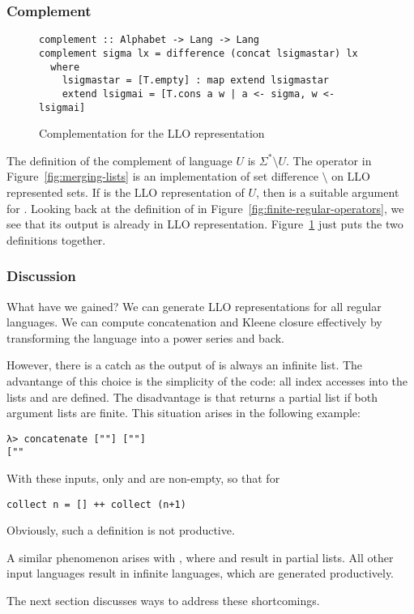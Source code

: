 \subsubsection{Complement}
\begin{figure}[tp]
\begin{lstlisting}
complement :: Alphabet -> Lang -> Lang
complement sigma lx = difference (concat lsigmastar) lx
  where
    lsigmastar = [T.empty] : map extend lsigmastar
    extend lsigmai = [T.cons a w | a <- sigma, w <- lsigmai]
\end{lstlisting}
  \caption{Complementation for the LLO representation}
  \label{fig:llo-complement}
\end{figure}
The definition of the complement of language $U$ is $\Sigma^*\setminus
U$.  The  operator in Figure~\ref{fig:merging-lists}
is an implementation of set difference $\setminus$ on LLO represented
sets.  If  is the LLO 
representation of $U$, then  is a suitable argument for
.  Looking back at the definition of
 in Figure~\ref{fig:finite-regular-operators}, we see
that its output is already in LLO
representation. Figure~\ref{fig:llo-complement} just puts the two
definitions together.

\subsubsection{Discussion}\label{sec:motivation-discussion}
What have we gained? We can generate LLO
representations for all regular languages. We can compute
concatenation and Kleene closure effectively by transforming the
language into a power series and back.

However, there is a catch as the output of  is always
an infinite list. The advantange of this choice is the simplicity of
the code: all index accesses into the lists  and
 are defined. The disadvantage is
that  returns a partial list if both argument lists
are finite.
This situation arises in the following example:
\begin{verbatim}
λ> concatenate [""] [""]
[""
\end{verbatim}
With these inputs, only  and  are
non-empty, so that for
\begin{lstlisting}[numbers=none]
collect n = [] ++ collect (n+1)
\end{lstlisting}
Obviously, such a definition is not productive.

A similar phenomenon arises with , where  and
 result in partial lists. All other input languages
result in infinite languages, which are generated productively.

The next section discusses ways to address these shortcomings.

